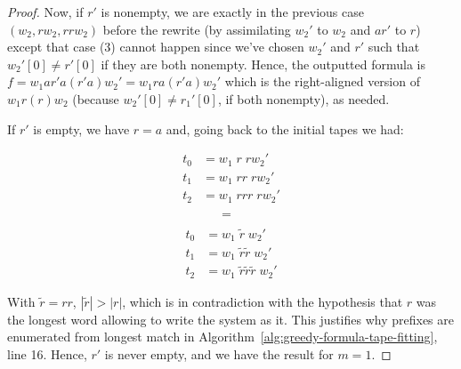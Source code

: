 \begin{proof}
    Now, if $r'$ is nonempty, we are exactly in the previous case $(w_2,rw_2,rrw_2)$ before the rewrite (by assimilating  $w_2'$ to $w_2$ and $ar'$ to $r$) except that case (3) cannot happen since we've chosen $w_2'$ and $r'$ such that $w_2'[0] \neq r'[0]$ if they are both nonempty. Hence, the outputted formula is $f = w_1 a r' a (r' a) w_2' = w_1 r a (r' a) w_2'$  which is the right-aligned version of $w_1r(r)w_2$ (because $w_2'[0] \neq r_1'[0]$, if both nonempty), as needed.

    If $r'$ is empty, we have $r = a$ and, going back to the initial tapes we had:
    \setlength{\columnsep}{-7.5cm}
    \begin{multicols}{3}
        \noindent
        \begin{align*}
            t_0 & = w_1\; r\;  r w_2'     \\
            t_1 & = w_1\; rr\;  r w_2'    \\
            t_2 & = w_1\; r r r\;  r w_2'
        \end{align*}
        \begin{align*}
             & \\
            =  \\
        \end{align*}
        \begin{align*}
            t_0 & = w_1\; \tilde{r}\;  w_2'                  \\
            t_1 & = w_1\; \tilde{r}\tilde{r}\;w_2'           \\
            t_2 & = w_1\; \tilde{r}\tilde{r}\tilde{r}\; w_2'
        \end{align*}
    \end{multicols}

    With $\tilde{r} = rr$, $|\tilde{r}| > |r|$, which is in contradiction with the hypothesis that $r$ was the longest word allowing to write the system as it. This justifies why prefixes are enumerated from longest match in Algorithm~\ref{alg:greedy-formula-tape-fitting}, line 16. Hence, $r'$ is never empty, and we have the result for $m=1$.


\end{proof}
